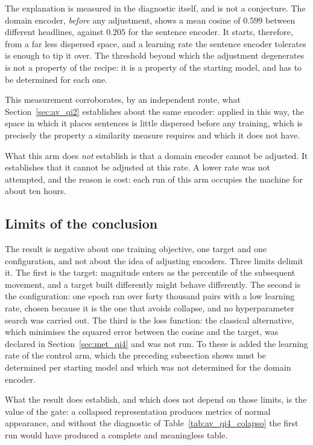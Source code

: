 The explanation is measured in the diagnostic itself, and is not a conjecture. The domain encoder,
\emph{before} any adjustment, shows a mean cosine of $0.599$ between different headlines, against
$0.205$ for the sentence encoder. It starts, therefore, from a far less dispersed space, and a
learning rate the sentence encoder tolerates is enough to tip it over. The threshold beyond which
the adjustment degenerates is not a property of the recipe: it is a property of the starting
model, and has to be determined for each one.

This measurement corroborates, by an independent route, what Section~\ref{sec:av_qi2} establishes
about the same encoder: applied in this way, the space in which it places sentences is little
dispersed before any training, which is precisely the property a similarity measure requires and
which it does not have.

What this arm does \emph{not} establish is that a domain encoder cannot be adjusted. It
establishes that it cannot be adjusted at this rate. A lower rate was not attempted, and the
reason is cost: each run of this arm occupies the machine for about ten hours.

\subsection{Limits of the conclusion}

The result is negative about one training objective, one target and one configuration, and not
about the idea of adjusting encoders. Three limits delimit it. The first is the target: magnitude
enters as the percentile of the subsequent movement, and a target built differently might behave
differently. The second is the configuration: one epoch ran over forty thousand pairs with a low
learning rate, chosen because it is the one that avoids collapse, and no hyperparameter search
was carried out. The third is the loss function: the classical alternative, which minimises the
squared error between the cosine and the target, was declared in Section~\ref{sec:met_qi4} and
was not run. To these is added the learning rate of the control arm, which the preceding
subsection shows must be determined per starting model and which was not determined for the
domain encoder.

What the result does establish, and which does not depend on those limits, is the value of the
gate: a collapsed representation produces metrics of normal appearance, and without the
diagnostic of Table~\ref{tab:av_qi4_colapso} the first run would have produced a complete and
meaningless table.

